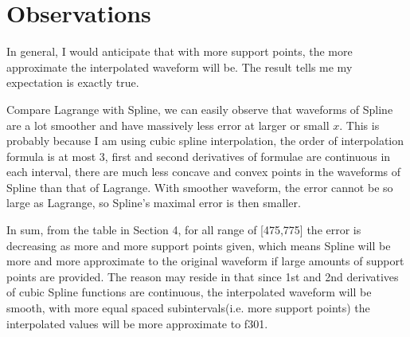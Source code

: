 \documentclass[12pt,a4paper]{article}
\begin{document}
\section{Observations}

In general, I would anticipate that with more support points, the more approximate the interpolated waveform will be. The result tells me my expectation is exactly true.

Compare Lagrange with Spline, we can easily observe that waveforms of Spline are a lot smoother and have massively less error at larger or small $x$. This is probably because I am using cubic spline interpolation, the order of interpolation formula is at most 3, first and second derivatives of formulae are continuous in each interval, there are much less concave and convex points in the waveforms of Spline than that of Lagrange. With smoother waveform, the error cannot be so large as Lagrange, so Spline's maximal error is then smaller.

In sum, from the table in Section 4, for all range of [475,775] the error is decreasing as more and more support points given, which means Spline will be more and more approximate to the original waveform if large amounts of support points are provided. The reason may reside in that since 1st and 2nd derivatives of cubic Spline functions are continuous, the interpolated waveform will be smooth, with more equal spaced subintervals(i.e. more support points) the interpolated values will be more approximate to f301.
\end{document}
